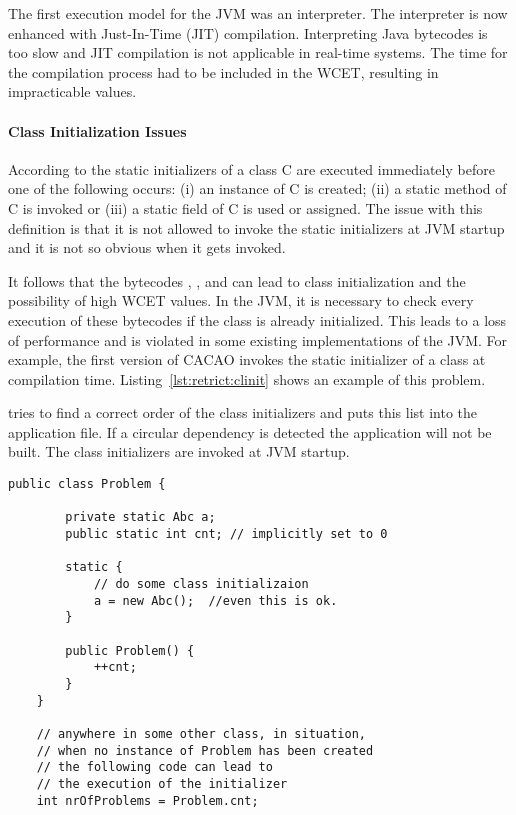 The first execution model for the JVM was an interpreter. The
interpreter is now enhanced with Just-In-Time (JIT) compilation.
Interpreting Java bytecodes is too slow and JIT compilation is not
applicable in real-time systems. The time for the compilation
process had to be included in the WCET, resulting in impracticable
values.

\paragraph{Class Initialization Issues}
\label{para:restrict:clinit}

According to \cite{jvm} the static initializers of a class C are
executed immediately before one of the following occurs: (i) an
instance of C is created; (ii) a static method of C is invoked or
(iii) a static field of C is used or assigned. The issue with this
definition is that it is not allowed to invoke the static
initializers at JVM startup and it is not so obvious when it gets
invoked.

It follows that the bytecodes , ,
 and  can lead to class initialization
and the possibility of high WCET values. In the JVM, it is necessary
to check every execution of these bytecodes if the class is already
initialized. This leads to a loss of performance and is violated in
some existing implementations of the JVM. For example, the first
version of CACAO \cite{cacao} invokes the static initializer of a
class at compilation time. Listing~\ref{lst:retrict:clinit} shows an
example of this problem.

 tries to find a correct order of the class
initializers and puts this list into the application file. If a
circular dependency is detected the application will not be built.
The class initializers are invoked at JVM startup.

\begin{lstlisting}[float,caption={Class initialization can occur very late},
label=lst:retrict:clinit]
    public class Problem {

        private static Abc a;
        public static int cnt; // implicitly set to 0

        static {
            // do some class initializaion
            a = new Abc();  //even this is ok.
        }

        public Problem() {
            ++cnt;
        }
    }

    // anywhere in some other class, in situation,
    // when no instance of Problem has been created
    // the following code can lead to
    // the execution of the initializer
    int nrOfProblems = Problem.cnt;

\end{lstlisting}

